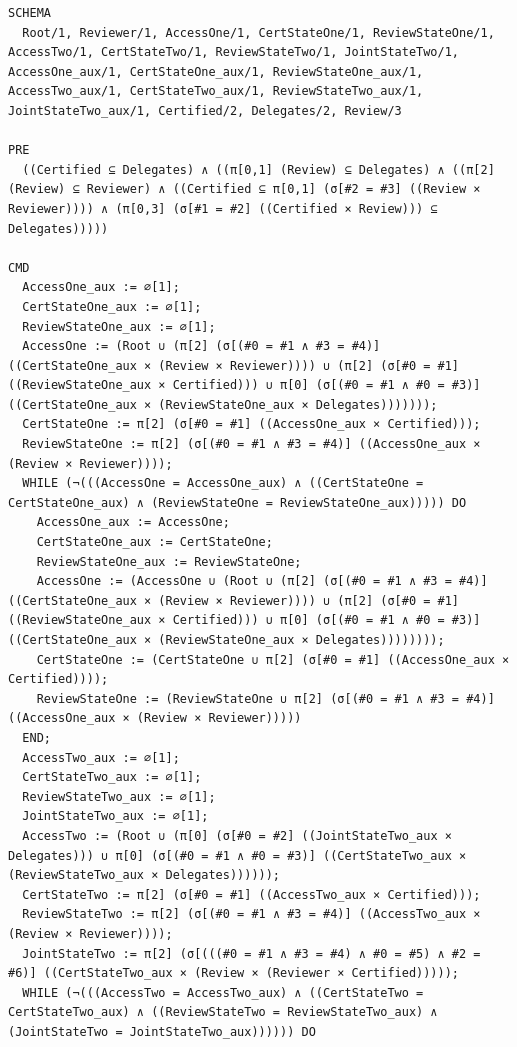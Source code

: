 \documentclass[10pt]{article}
\begin{document}
\begin{Verbatim}[fontsize=\tiny,breaklines=true,breakanywhere=true,frame=single,framesep=1.5mm]
SCHEMA
  Root/1, Reviewer/1, AccessOne/1, CertStateOne/1, ReviewStateOne/1, AccessTwo/1, CertStateTwo/1, ReviewStateTwo/1, JointStateTwo/1, AccessOne_aux/1, CertStateOne_aux/1, ReviewStateOne_aux/1, AccessTwo_aux/1, CertStateTwo_aux/1, ReviewStateTwo_aux/1, JointStateTwo_aux/1, Certified/2, Delegates/2, Review/3

PRE
  ((Certified ⊆ Delegates) ∧ ((π[0,1] (Review) ⊆ Delegates) ∧ ((π[2] (Review) ⊆ Reviewer) ∧ ((Certified ⊆ π[0,1] (σ[#2 = #3] ((Review × Reviewer)))) ∧ (π[0,3] (σ[#1 = #2] ((Certified × Review))) ⊆ Delegates)))))

CMD
  AccessOne_aux := ∅[1];
  CertStateOne_aux := ∅[1];
  ReviewStateOne_aux := ∅[1];
  AccessOne := (Root ∪ (π[2] (σ[(#0 = #1 ∧ #3 = #4)] ((CertStateOne_aux × (Review × Reviewer)))) ∪ (π[2] (σ[#0 = #1] ((ReviewStateOne_aux × Certified))) ∪ π[0] (σ[(#0 = #1 ∧ #0 = #3)] ((CertStateOne_aux × (ReviewStateOne_aux × Delegates)))))));
  CertStateOne := π[2] (σ[#0 = #1] ((AccessOne_aux × Certified)));
  ReviewStateOne := π[2] (σ[(#0 = #1 ∧ #3 = #4)] ((AccessOne_aux × (Review × Reviewer))));
  WHILE (¬(((AccessOne = AccessOne_aux) ∧ ((CertStateOne = CertStateOne_aux) ∧ (ReviewStateOne = ReviewStateOne_aux))))) DO
    AccessOne_aux := AccessOne;
    CertStateOne_aux := CertStateOne;
    ReviewStateOne_aux := ReviewStateOne;
    AccessOne := (AccessOne ∪ (Root ∪ (π[2] (σ[(#0 = #1 ∧ #3 = #4)] ((CertStateOne_aux × (Review × Reviewer)))) ∪ (π[2] (σ[#0 = #1] ((ReviewStateOne_aux × Certified))) ∪ π[0] (σ[(#0 = #1 ∧ #0 = #3)] ((CertStateOne_aux × (ReviewStateOne_aux × Delegates))))))));
    CertStateOne := (CertStateOne ∪ π[2] (σ[#0 = #1] ((AccessOne_aux × Certified))));
    ReviewStateOne := (ReviewStateOne ∪ π[2] (σ[(#0 = #1 ∧ #3 = #4)] ((AccessOne_aux × (Review × Reviewer)))))
  END;
  AccessTwo_aux := ∅[1];
  CertStateTwo_aux := ∅[1];
  ReviewStateTwo_aux := ∅[1];
  JointStateTwo_aux := ∅[1];
  AccessTwo := (Root ∪ (π[0] (σ[#0 = #2] ((JointStateTwo_aux × Delegates))) ∪ π[0] (σ[(#0 = #1 ∧ #0 = #3)] ((CertStateTwo_aux × (ReviewStateTwo_aux × Delegates))))));
  CertStateTwo := π[2] (σ[#0 = #1] ((AccessTwo_aux × Certified)));
  ReviewStateTwo := π[2] (σ[(#0 = #1 ∧ #3 = #4)] ((AccessTwo_aux × (Review × Reviewer))));
  JointStateTwo := π[2] (σ[(((#0 = #1 ∧ #3 = #4) ∧ #0 = #5) ∧ #2 = #6)] ((CertStateTwo_aux × (Review × (Reviewer × Certified)))));
  WHILE (¬(((AccessTwo = AccessTwo_aux) ∧ ((CertStateTwo = CertStateTwo_aux) ∧ ((ReviewStateTwo = ReviewStateTwo_aux) ∧ (JointStateTwo = JointStateTwo_aux)))))) DO

\end{Verbatim}
\end{document}
